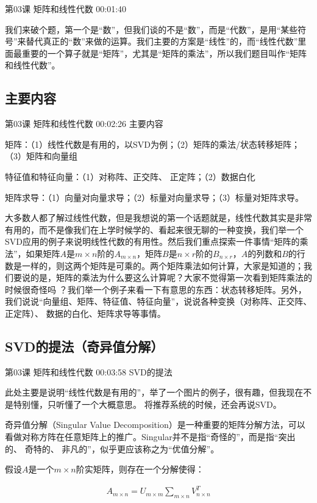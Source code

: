 \documentclass[UTF8]{ctexbook}
\begin{document}
第03课 矩阵和线性代数 00:01:40

我们来破个题，第一个是“数”，但我们谈的不是“数”，而是“代数”，是用“某些符号”来替代真正的“数”来做的运算。我们主要的方案是“线性”的，而“线性代数”里面最重要的一个算子就是“矩阵”，尤其是“矩阵的乘法”，所以我们题目叫作“矩阵和线性代数”。

\subsection{主要内容}

第03课 矩阵和线性代数 00:02:26 主要内容

矩阵：（1）线性代数是有用的，以SVD为例；（2）矩阵的乘法/状态转移矩阵；（3）矩阵和向量组

特征值和特征向量：（1）对称阵、正交阵、 正定阵；（2）数据白化

矩阵求导：（1）向量对向量求导；（2）标量对向量求导；（3）标量对矩阵求导。

大多数人都了解过线性代数，但是我想说的第一个话题就是，线性代数其实是非常有用的，而不是像我们在上学时候学的、看起来很无聊的一种变换，我们举一个SVD应用的例子来说明线性代数的有用性。然后我们重点探索一件事情“矩阵的乘法”，如果矩阵$A$是$m\times n$阶的$A_{m \times n}$，矩阵$B$是$n \times r$阶的$B_{n \times r}$，$A$的列数和$B$的行数是一样的，则这两个矩阵是可乘的。两个矩阵乘法如何计算，大家是知道的；我们要说的是，矩阵的乘法为什么要这么计算呢？大家不觉得第一次看到矩阵乘法的时候很奇怪吗 ？我们举一个例子来看一下有意思的东西：状态转移矩阵。另外，我们说说“向量组、矩阵、特征值、特征向量”，说说各种变换（对称阵、正交阵、正定阵）、 数据的白化、矩阵求导等事情。

\subsection{SVD的提法（奇异值分解）}

第03课 矩阵和线性代数 00:03:58 SVD的提法

此处主要是说明“线性代数是有用的”，举了一个图片的例子，很有趣，但我现在不是特别懂，只听懂了一个大概意思。
将推荐系统的时候，还会再说SVD。

奇异值分解（Singular Value Decomposition）是一种重要的矩阵分解方法，可以看做对称方阵在任意矩阵上的推广。Singular并不是指“奇怪的”，而是指“突出的、 奇特的、 非凡的”，似乎更应该称之为“优值分解”。

假设$A$是一个$m \times n$阶实矩阵，则存在一个分解使得：

\begin{equation}
\begin{aligned}
A_{m \times n} = U_{m \times m} \sum _{m \times n} V_{n \times n}^{T}
\end{aligned}
\end{equation}
\end{document}
